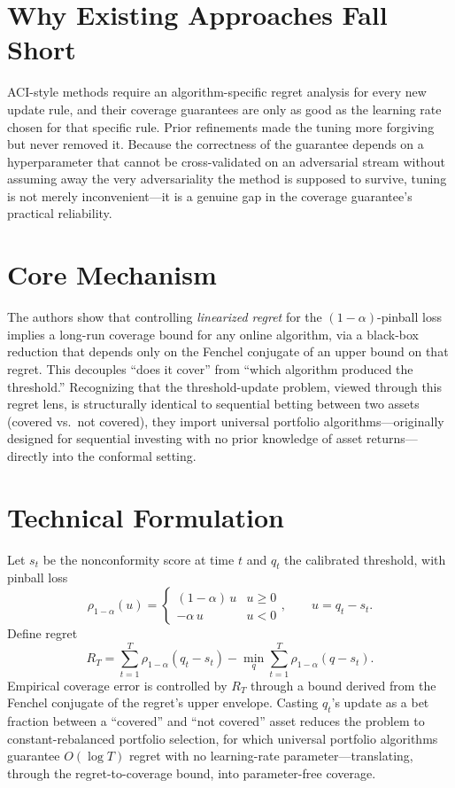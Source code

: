 \documentclass[10pt,twocolumn]{article}
\begin{document}
\section{Why Existing Approaches Fall Short}

ACI-style methods require an algorithm-specific regret analysis for
every new update rule, and their coverage guarantees are only as good
as the learning rate chosen for that specific rule. Prior refinements
made the tuning more forgiving but never removed it. Because the
correctness of the guarantee depends on a hyperparameter that cannot be
cross-validated on an adversarial stream without assuming away the very
adversariality the method is supposed to survive, tuning is not merely
inconvenient---it is a genuine gap in the coverage guarantee's
practical reliability.

\section{Core Mechanism}

The authors show that controlling \emph{linearized regret} for the
$(1-\alpha)$-pinball loss implies a long-run coverage bound for any
online algorithm, via a black-box reduction that depends only on the
Fenchel conjugate of an upper bound on that regret. This decouples
``does it cover'' from ``which algorithm produced the threshold.''
Recognizing that the threshold-update problem, viewed through this
regret lens, is structurally identical to sequential betting between
two assets (covered vs.\ not covered), they import universal portfolio
algorithms---originally designed for sequential investing with no
prior knowledge of asset returns---directly into the conformal setting.

\section{Technical Formulation}

Let $s_t$ be the nonconformity score at time $t$ and $q_t$ the
calibrated threshold, with pinball loss
\[
\rho_{1-\alpha}(u) =
\begin{cases}
  (1-\alpha)\,u & u \ge 0 \\
  -\alpha\,u & u < 0
\end{cases},
\qquad u = q_t - s_t.
\]
Define regret
\[
R_T = \sum_{t=1}^{T} \rho_{1-\alpha}(q_t - s_t)
  - \min_{q} \sum_{t=1}^{T} \rho_{1-\alpha}(q - s_t).
\]
Empirical coverage error is controlled by $R_T$ through a bound derived
from the Fenchel conjugate of the regret's upper envelope. Casting
$q_t$'s update as a bet fraction between a ``covered'' and ``not
covered'' asset reduces the problem to constant-rebalanced portfolio
selection, for which universal portfolio algorithms guarantee
$O(\log T)$ regret with no learning-rate parameter---translating,
through the regret-to-coverage bound, into parameter-free coverage.
\end{document}
